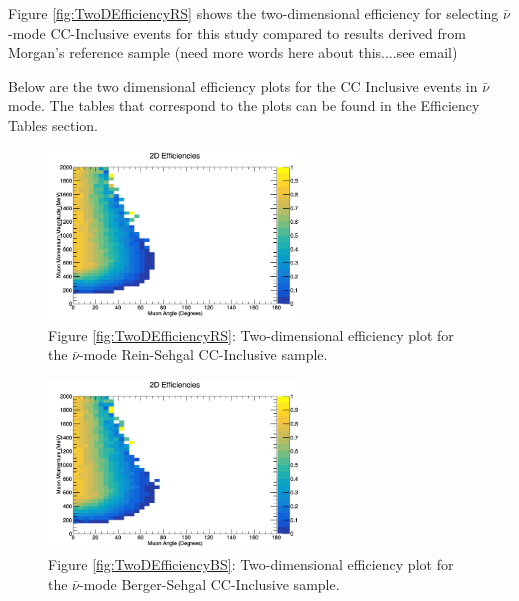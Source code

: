 \documentclass[11pt]{article}
\begin{document}
Figure \ref*{fig:TwoDEfficiencyRS} shows the two-dimensional efficiency for selecting $\bar{\nu}$-mode CC-Inclusive events for this study compared to results derived from Morgan's reference sample (need more words here about this....see email)

Below are the two dimensional efficiency plots for the CC Inclusive events in $\bar{\nu}$ mode. The tables that correspond to the plots can be found in the Efficiency Tables section.

\begin{figure}[H]
\centering
\includegraphics[width=0.6\textwidth]{CCInclusivePlots/2DEffCompareANMRS.png}
\caption*{Figure \ref*{fig:TwoDEfficiencyRS}: Two-dimensional efficiency plot for the $\bar{\nu}$-mode Rein-Sehgal CC-Inclusive sample.}
\end{figure}\label{fig:TwoDEfficiencyRS}

\begin{figure}[H]
\centering
\includegraphics[width=0.6\textwidth]{CCInclusivePlots/2DEffCompareANMBS.png}
\caption*{Figure \ref*{fig:TwoDEfficiencyBS}: Two-dimensional efficiency plot for the $\bar{\nu}$-mode Berger-Sehgal CC-Inclusive sample.}
\end{figure}\label{fig:TwoDEfficiencyBS}
\end{document}
